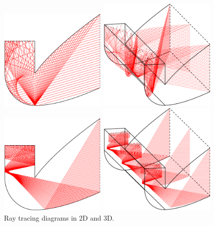 \begin{figure}[ht!]
	\begin{minipage}{0.49\columnwidth}
		\includegraphics[width=0.90\columnwidth,height=5cm]{figs/2D-diagram-15.eps}
		
		\includegraphics[width=0.95\columnwidth,height=5.5cm]{figs/3D-diagram-15.eps}
	\end{minipage}
	\begin{minipage}{0.49\columnwidth}
		\includegraphics[width=0.90\columnwidth,height=5cm]{figs/2D-diagram-60.eps}
		
		\includegraphics[width=0.95\columnwidth,height=5.5cm]{figs/3D-diagram-60.eps}
		
	\end{minipage}
	\caption{Ray tracing diagrams in 2D and 3D.}
	\label{RT-diagram}
\end{figure}

